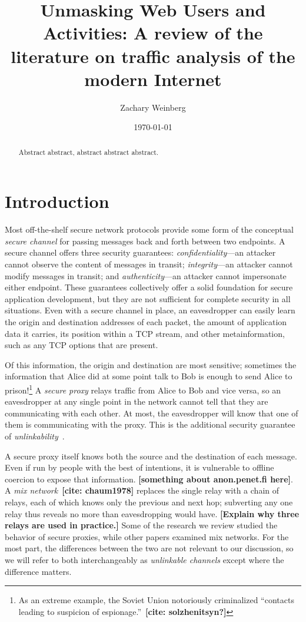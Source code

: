 \documentclass{zarticle}
\def\todo#1{{\color{todocolor}\bfseries [#1]}}
\def\needcite#1{\todo{cite: #1}}
\begin{document}
\title{Unmasking Web Users and Activities:
  A review of the literature on traffic analysis of the modern Internet}
\author{Zachary Weinberg}
\date{\today}
\maketitle

\begin{abstract}
Abstract abstract, abstract abstract abstract.
\end{abstract}

\section{Introduction}

Most off-the-shelf secure network protocols provide some form of the
conceptual \emph{secure channel} for passing messages back and forth
between two endpoints.  A secure channel offers three security
guarantees: \emph{confidentiality}---an attacker cannot observe the
content of messages in transit; \emph{integrity}---an attacker cannot
modify messages in transit; and \emph{authenticity}---an attacker
cannot impersonate either endpoint.  These guarantees collectively
offer a solid foundation for secure application development, but they
are not sufficient for complete security in all situations.  Even with
a secure channel in place, an eavesdropper can easily learn the origin
and destination addresses of each packet, the amount of application
data it carries, its position within a TCP stream, and other
metainformation, such as any TCP options that are present.

Of this information, the origin and destination are most sensitive;
sometimes the information that Alice did at some point talk to Bob is
enough to send Alice to prison!\footnote{As an extreme example, the
  Soviet Union notoriously criminalized “contacts leading to suspicion
  of espionage.”~\needcite{solzhenitsyn?}} A \emph{secure proxy}
relays traffic from Alice to Bob and vice versa, so an eavesdropper at
any single point in the network cannot tell that they are
communicating with each other.  At most, the eavesdropper will know
that one of them is communicating with the proxy.  This is the
additional security guarantee of
\emph{unlinkability}~\cite{pfitzmann2010terminology}.

A secure proxy itself knows both the source and the destination of
each message.  Even if run by people with the best of intentions, it
is vulnerable to offline coercion to expose that
information. \todo{something about anon.penet.fi here}.  A \emph{mix
  network}~\needcite{chaum1978} replaces the single relay with a chain
of relays, each of which knows only the previous and next hop;
subverting any one relay thus reveals no more than eavesdropping would
have. \todo{Explain why three relays are used in practice.}  Some of
the research we review studied the behavior of secure proxies, while
other papers examined mix networks.  For the most part, the
differences between the two are not relevant to our discussion, so we
will refer to both interchangeably as \emph{unlinkable channels}
except where the difference matters.
\end{document}
